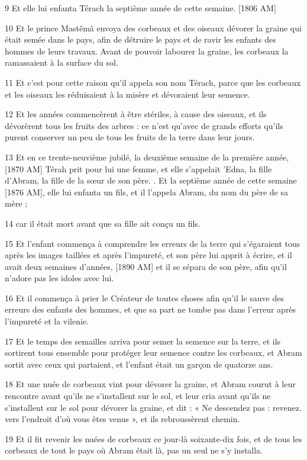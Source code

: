 \par 9 Et elle lui enfanta Térach la septième année de cette semaine. [1806 AM]
\par 10 Et le prince Mastêmâ envoya des corbeaux et des oiseaux dévorer la graine qui était semée dans le pays, afin de détruire le pays et de ravir les enfants des hommes de leurs travaux. Avant de pouvoir labourer la graine, les corbeaux la ramassaient à la surface du sol.
\par 11 Et c'est pour cette raison qu'il appela son nom Térach, parce que les corbeaux et les oiseaux les réduisaient à la misère et dévoraient leur semence.
\par 12 Et les années commencèrent à être stériles, à cause des oiseaux, et ils dévorèrent tous les fruits des arbres : ce n'est qu'avec de grands efforts qu'ils purent conserver un peu de tous les fruits de la terre dans leur jours.
\par 13 Et en ce trente-neuvième jubilé, la deuxième semaine de la première année, [1870 AM] Térah prit pour lui une femme, et elle s'appelait 'Edna, la fille d'Abram, la fille de la sœur de son père. . Et la septième année de cette semaine [1876 AM], elle lui enfanta un fils, et il l'appela Abram, du nom du père de sa mère ;
\par 14 car il était mort avant que sa fille ait conçu un fils.
\par 15 Et l'enfant commença à comprendre les erreurs de la terre qui s'égaraient tous après les images taillées et après l'impureté, et son père lui apprit à écrire, et il avait deux semaines d'années, [1890 AM] et il se sépara de son père, afin qu'il n'adore pas les idoles avec lui.
\par 16 Et il commença à prier le Créateur de toutes choses afin qu'il le sauve des erreurs des enfants des hommes, et que sa part ne tombe pas dans l'erreur après l'impureté et la vilenie.
\par 17 Et le temps des semailles arriva pour semer la semence sur la terre, et ils sortirent tous ensemble pour protéger leur semence contre les corbeaux, et Abram sortit avec ceux qui partaient, et l'enfant était un garçon de quatorze ans.
\par 18 Et une nuée de corbeaux vint pour dévorer la graine, et Abram courut à leur rencontre avant qu'ils ne s'installent sur le sol, et leur cria avant qu'ils ne s'installent sur le sol pour dévorer la graine, et dit : « Ne descendez pas : revenez. vers l'endroit d'où vous êtes venus », et ils rebroussèrent chemin.
\par 19 Et il fit revenir les nuées de corbeaux ce jour-là soixante-dix fois, et de tous les corbeaux de tout le pays où Abram était là, pas un seul ne s'y installa.
